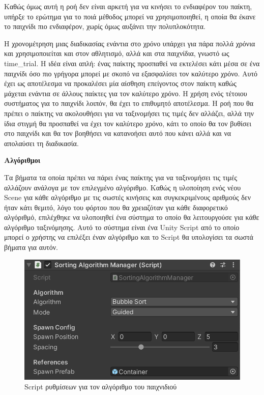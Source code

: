 Καθώς όμως αυτή η ροή δεν είναι αρκετή για να κινήσει το ενδιαφέρον του παίκτη, υπήρξε το ερώτημα για το ποιά μέθοδος μπορεί να χρησιμοποιηθεί, η οποία θα έκανε το παιχνίδι πιο ενδιαφέρον, χωρίς όμως αυξάνει την πολυπλοκότητα.

Η χρονομέτρηση μιας διαδικασίας ενάντια στο χρόνο υπάρχει για πάρα πολλά χρόνια και χρησιμοποιείται και στον αθλητισμό, αλλά και στα παιχνίδια, γνωστό ως \gls{time_trial}. Η ιδέα είναι απλή: ένας παίκτης προσπαθεί να εκτελέσει κάτι μέσα σε ένα παιχνίδι όσο πιο γρήγορα μπορεί με σκοπό να εξασφαλίσει τον καλύτερο χρόνο. Αυτό έχει ως αποτέλεσμα να προκαλέσει μία αίσθηση επείγοντος στον παίκτη καθώς μάχεται ενάντια σε άλλους παίκτες για τον καλύτερο χρόνο. Η χρήση ενός τέτοιου συστήματος για το παιχνίδι λοιπόν, θα έχει το επιθυμητό αποτέλεσμα. Η ροή που θα πρέπει ο παίκτης να ακολουθήσει για να ταξινομήσει τις τιμές δεν αλλάζει, αλλά την ίδια στιγμή θα προσπαθεί να έχει τον καλύτερο χρόνο, κάτι το οποίο θα τον βυθίσει στο παιχνίδι και θα τον βοηθήσει να κατανοήσει αυτό που κάνει αλλά και να απολαύσει τη διαδικασία.

\textbf{Αλγόριθμοι}

Τα βήματα τα οποία πρέπει να πάρει ένας παίκτης για να ταξινομήσει τις τιμές αλλάζουν ανάλογα με τον επιλεγμένο αλγόριθμο. Καθώς η υλοποίηση ενός νέου Scene για κάθε αλγόριθμο με τις σωστές κινήσεις και συγκεκριμένους αριθμούς δεν ήταν κάτι θεμιτό, λόγο του φόρτου που θα χρειαζόταν για κάθε διαφορετικό αλγόριθμό, επιλέχθηκε να υλοποιηθεί ένα σύστημα το οποίο θα λειτουργούσε για κάθε αλγόριθμο ταξινόμησης. Αυτό το σύστημα είναι ένα Unity Script από το οποίο μπορεί ο χρήστης να επιλέξει έναν αλγόριθμο και το Script θα υπολογίσει τα σωστά βήματα για αυτόν.

\begin{figure}[H]
    \centering
    \includegraphics[width=0.6\linewidth]{sections/4/2/images/unity_editor_sorting_algorithm_manager}
    \caption{Script ρυθμίσεων για τον αλγόριθμο του παιχνιδιού}
    \label{fig:unity_editor_sorting_algorithm_manager}
\end{figure}

